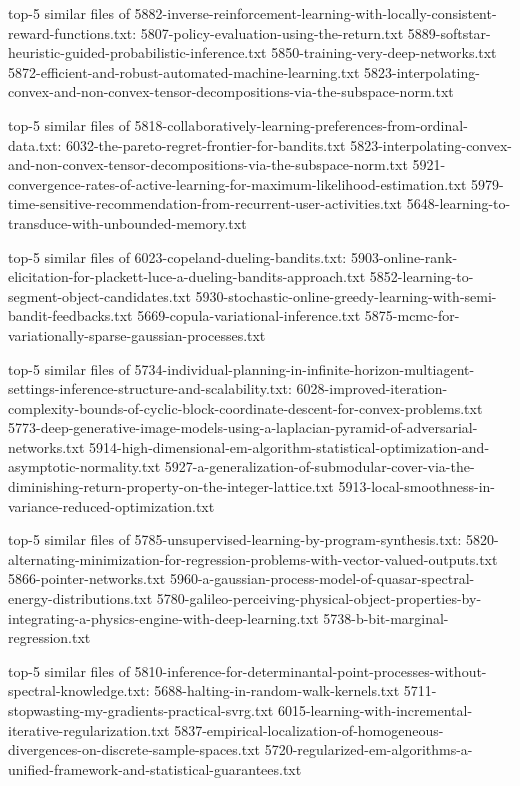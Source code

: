 \documentclass[11pt]{article}
\begin{document}
top-5 similar files of
5882-inverse-reinforcement-learning-with-locally-consistent-reward-functions.txt:
5807-policy-evaluation-using-the-return.txt
5889-softstar-heuristic-guided-probabilistic-inference.txt
5850-training-very-deep-networks.txt
5872-efficient-and-robust-automated-machine-learning.txt
5823-interpolating-convex-and-non-convex-tensor-decompositions-via-the-subspace-norm.txt

top-5 similar files of
5818-collaboratively-learning-preferences-from-ordinal-data.txt:
6032-the-pareto-regret-frontier-for-bandits.txt
5823-interpolating-convex-and-non-convex-tensor-decompositions-via-the-subspace-norm.txt
5921-convergence-rates-of-active-learning-for-maximum-likelihood-estimation.txt
5979-time-sensitive-recommendation-from-recurrent-user-activities.txt
5648-learning-to-transduce-with-unbounded-memory.txt

top-5 similar files of 6023-copeland-dueling-bandits.txt:
5903-online-rank-elicitation-for-plackett-luce-a-dueling-bandits-approach.txt
5852-learning-to-segment-object-candidates.txt
5930-stochastic-online-greedy-learning-with-semi-bandit-feedbacks.txt
5669-copula-variational-inference.txt
5875-mcmc-for-variationally-sparse-gaussian-processes.txt

top-5 similar files of
5734-individual-planning-in-infinite-horizon-multiagent-settings-inference-structure-and-scalability.txt:
6028-improved-iteration-complexity-bounds-of-cyclic-block-coordinate-descent-for-convex-problems.txt
5773-deep-generative-image-models-using-a-laplacian-pyramid-of-adversarial-networks.txt
5914-high-dimensional-em-algorithm-statistical-optimization-and-asymptotic-normality.txt
5927-a-generalization-of-submodular-cover-via-the-diminishing-return-property-on-the-integer-lattice.txt
5913-local-smoothness-in-variance-reduced-optimization.txt

top-5 similar files of
5785-unsupervised-learning-by-program-synthesis.txt:
5820-alternating-minimization-for-regression-problems-with-vector-valued-outputs.txt
5866-pointer-networks.txt
5960-a-gaussian-process-model-of-quasar-spectral-energy-distributions.txt
5780-galileo-perceiving-physical-object-properties-by-integrating-a-physics-engine-with-deep-learning.txt
5738-b-bit-marginal-regression.txt

top-5 similar files of
5810-inference-for-determinantal-point-processes-without-spectral-knowledge.txt:
5688-halting-in-random-walk-kernels.txt
5711-stopwasting-my-gradients-practical-svrg.txt
6015-learning-with-incremental-iterative-regularization.txt
5837-empirical-localization-of-homogeneous-divergences-on-discrete-sample-spaces.txt
5720-regularized-em-algorithms-a-unified-framework-and-statistical-guarantees.txt
\end{document}

